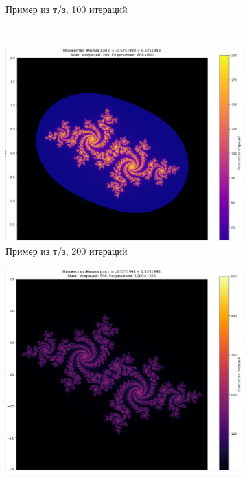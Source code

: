 \begin{figure}[H]
\begin{subfigure}{0.4\textwidth}
        \caption{Пример из т/з, 100 итераций}
    \end{subfigure}
    \\
    \begin{subfigure}{0.4\textwidth}
        \includegraphics[width=\textwidth]{plots/J1.png}
        \caption{Пример из т/з, 200 итераций}
    \end{subfigure}
    \hspace{1.7cm}
    \begin{subfigure}{0.4\textwidth}
        \includegraphics[width=\textwidth]{plots/J2.png}

\end{subfigure}
\end{figure}
